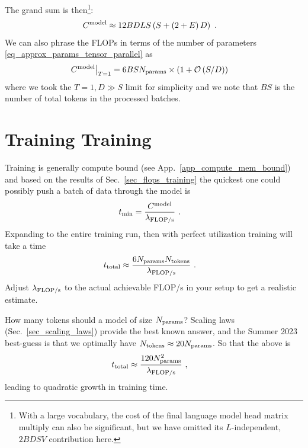 \documentclass[11pt]{article}
\begin{document}
The grand sum is then\footnote{With a large vocabulary, the cost of the final language model head
matrix multiply can also be significant, but we have omitted its $ L $-independent,  $ 2BDSV $
contribution here. }:
\begin{align}
C  ^{ {\rm  model}  } &\approx 12 BDLS \left ( S + \left ( 2+E \right )D \right ) \label{eq_model_flops}\ .
\end{align}
We can also phrase the FLOPs in terms of the number of parameters \eqref{eq_approx_params_tensor_parallel} as
\begin{align}
 C  ^{ {\rm  model}  } \big| _{ T=1 }  &= 6BS N _{ {\rm  params}  }\times \left ( 1 + \mathcal{O} \left( S/D\right)  \right )
\end{align}
where we took the $ T=1, D \gg S $ limit for simplicity and we note that $ BS $  is the number of
total tokens in the processed batches.


\section{Training Training \label{sec_train_time} }



Training is generally compute bound (see App.~\ref{app_compute_mem_bound}) and based on the results
of Sec.~\ref{sec_flops_training} the quickest one could possibly push a batch of data through the
model is
\begin{align}
  t _{ {\rm  min} }  &= \frac{ C  ^{ {\rm  model}  }  }{   \lambda _{ {\rm FLOP/s} } }\ . \label{eq_tmin_model}
\end{align}
Expanding to the entire training run, then with perfect utilization training will take a time
\begin{align}
  t _{ {\rm  total} }  &\approx  \frac{6N _{ {\rm params} } N _{ {\rm tokens} }}{   \lambda _{ {\rm FLOP/s} } }\ . \label{eq_training_rule_of_thumb}
\end{align}
Adjust $ \lambda _{ {\rm FLOP/s} } $ to the actual achievable FLOP/s in your setup to get a realistic estimate.

How many tokens should a model of size $ N _{ {\rm params} } $? Scaling laws (Sec.~\ref{sec_scaling_laws}) provide
the best known answer, and the Summer 2023 best-guess is that we optimally have $ N _{ {\rm tokens} }\approx 20 N _{ {\rm params} } $.
So that the above is
\begin{align}
t _{ {\rm  total} }  &\approx  \frac{120N _{ {\rm params} } ^{ 2 }}{   \lambda _{ {\rm FLOP/s} } }\ ,
\end{align}
leading to quadratic growth in training time.
\end{document}
